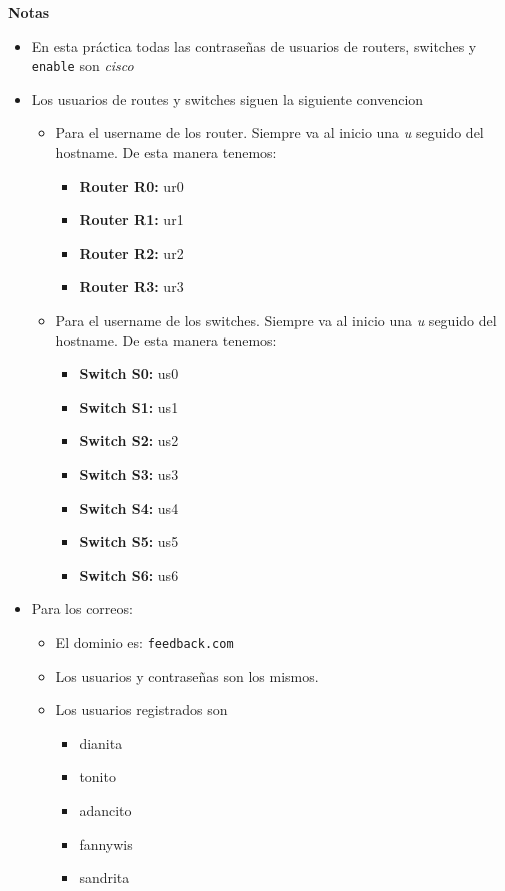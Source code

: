 \documentclass{article}
\begin{document}
\textbf{Notas}
\begin{itemize}
  \item En esta práctica todas las contraseñas de usuarios de routers, 
  switches y  \texttt{enable} son \textit{cisco}
  \item Los usuarios de routes y switches siguen la siguiente convencion
  \begin{itemize}
    \item Para el username de los router. Siempre va al inicio una \textit{u}
    seguido del hostname. De esta manera tenemos:
    \begin{itemize}
      \item \textbf{Router R0:} ur0
      \item \textbf{Router R1:} ur1
      \item \textbf{Router R2:} ur2
      \item \textbf{Router R3:} ur3
    \end{itemize}
    \item Para el username de los switches. Siempre va al inicio una \textit{u}
    seguido del hostname. De esta manera tenemos:
    \begin{itemize}
      \item \textbf{Switch S0:} us0
      \item \textbf{Switch S1:} us1
      \item \textbf{Switch S2:} us2
      \item \textbf{Switch S3:} us3
      \item \textbf{Switch S4:} us4
      \item \textbf{Switch S5:} us5
      \item \textbf{Switch S6:} us6
    \end{itemize}    
  \end{itemize}
  \item Para los correos:
  \begin{itemize}
    \item El dominio es: \texttt{feedback.com}
    \item Los usuarios y contraseñas son los mismos.
    \item Los usuarios registrados son
    \begin{itemize}
      \item dianita
      \item tonito
      \item adancito
      \item fannywis
      \item sandrita
    \end{itemize}
  \end{itemize}
\end{itemize}
\end{document}
